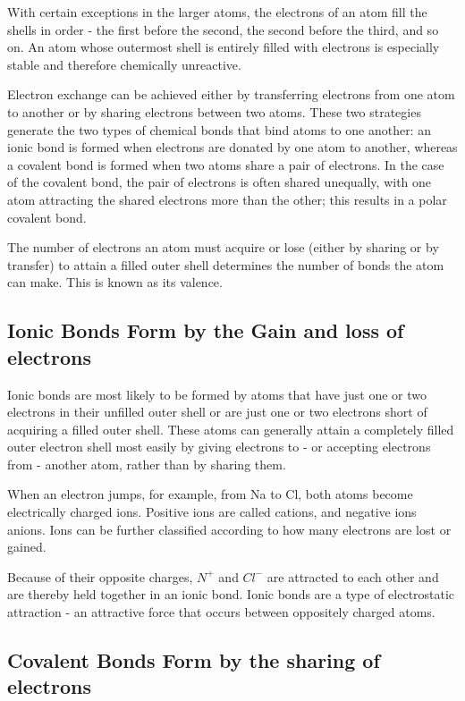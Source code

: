 With certain exceptions in the larger atoms, the electrons of an atom fill
the shells in order - the first before the second, the second before the third,
and so on. An atom whose outermost shell is entirely filled with electrons
is especially stable and therefore chemically unreactive.

Electron exchange can be achieved either by transferring electrons from one
atom to another or by sharing electrons between two atoms. These two strategies generate the two
types of chemical bonds that bind atoms to one another: an ionic bond
is formed when electrons are donated by one atom to another, whereas a
covalent bond is formed when two atoms share a pair of electrons.
In the case of the covalent bond, the pair of electrons is often shared
unequally, with one atom attracting the shared electrons more than the
other; this results in a polar covalent bond.

The number of electrons an atom must acquire or lose (either by sharing or
by transfer) to attain a filled outer shell determines the number of bonds
the atom can make. This is known as its valence.

\subsection{Ionic Bonds Form by the Gain and loss of electrons}

Ionic bonds are most likely to be formed by atoms that have just one or
two electrons in their unfilled outer shell or are just one or two electrons
short of acquiring a filled outer shell. These atoms can generally attain
a completely filled outer electron shell most easily by giving electrons
to - or accepting electrons from - another atom, rather than by sharing
them.

When an electron jumps, for example, from Na to Cl, both atoms become
electrically charged ions.
Positive ions are called cations, and negative ions anions. Ions can be
further classified according to how many electrons are lost or gained.

Because of their opposite charges, $N^{+}$ and $Cl^{-}$ are attracted to each other
and are thereby held together in an ionic bond.
Ionic bonds are a type of electrostatic attraction - an attractive force
that occurs between oppositely charged atoms.

\subsection{Covalent Bonds Form by the sharing of electrons}

